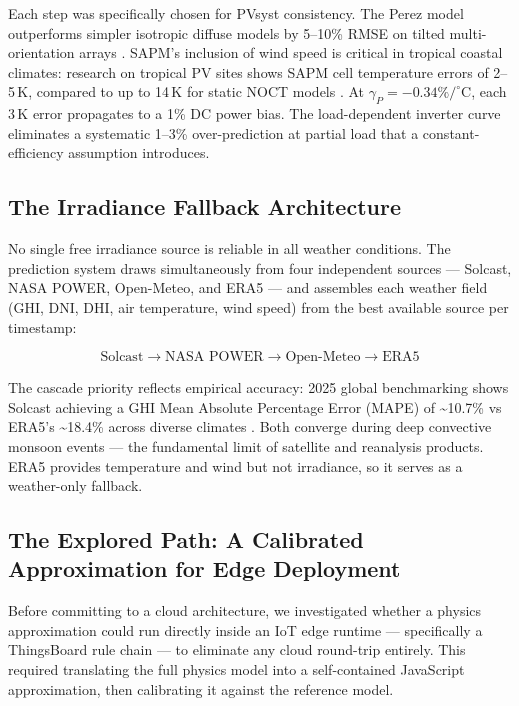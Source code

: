 \documentclass[11pt, a4paper]{article}
\begin{document}
\begin{insightbox}
Each step was specifically chosen for PVsyst consistency. The Perez model
outperforms simpler isotropic diffuse models by 5--10\% RMSE on tilted
multi-orientation arrays \cite{gueymard2009direct}. SAPM's inclusion of
wind speed is critical in tropical coastal climates: research on tropical
PV sites shows SAPM cell temperature errors of 2--5\,K, compared to up
to 14\,K for static NOCT models \cite{king2004photovoltaic}. At
$\gamma_P = -0.34\%/^\circ$C, each 3\,K error propagates to a 1\% DC
power bias. The load-dependent inverter curve eliminates a systematic 1--3\%
over-prediction at partial load that a constant-efficiency assumption introduces.
\end{insightbox}

\subsection{The Irradiance Fallback Architecture}

No single free irradiance source is reliable in all weather conditions.
The prediction system draws simultaneously from four independent sources
--- Solcast, NASA POWER, Open-Meteo, and ERA5 --- and assembles each
weather field (GHI, DNI, DHI, air temperature, wind speed) from the
best available source per timestamp:

\[
\text{Solcast} \to \text{NASA POWER} \to \text{Open-Meteo} \to \text{ERA5}
\]

The cascade priority reflects empirical accuracy: 2025 global benchmarking
shows Solcast achieving a GHI Mean Absolute Percentage Error (MAPE) of
\textasciitilde{}10.7\% vs ERA5's \textasciitilde{}18.4\% across diverse
climates \cite{ineichen2011global}. Both converge during deep convective
monsoon events --- the fundamental limit of satellite and reanalysis products.
ERA5 provides temperature and wind but not irradiance, so it serves as a
weather-only fallback.

\subsection{The Explored Path: A Calibrated Approximation for Edge Deployment}

Before committing to a cloud architecture, we investigated whether a physics
approximation could run directly inside an IoT edge runtime --- specifically
a ThingsBoard rule chain --- to eliminate any cloud round-trip entirely.
This required translating the full physics model into a self-contained
JavaScript approximation, then calibrating it against the reference model.
\end{document}
